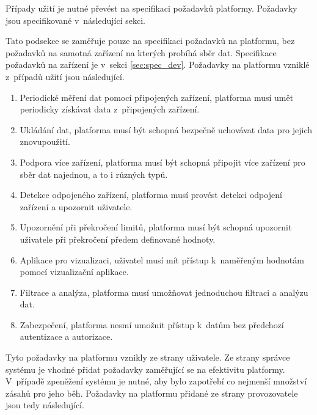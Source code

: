 Případy užití je nutné převést na specifikaci požadavků platformy. Požadavky jsou specifikované v~následující sekci.

 \label{sec:system_requirements}
Tato podsekce se zaměřuje pouze na specifikaci požadavků na platformu, bez požadavků na samotná zařízení na kterých probíhá sběr dat. Specifikace požadavků na zařízení je v~sekci \ref{sec:spec_dev}. Požadavky na platformu vzniklé z~případů užití jsou následující.
\begin{enumerate}
    \item Periodické měření dat pomocí připojených zařízení, platforma musí umět periodicky získávat data z~připojených zařízení. \label{spec:1}
    \item Ukládání dat, platforma musí být schopná bezpečně uchovávat data pro jejich znovupoužití. \label{spec:2}
    \item Podpora více zařízení, platforma musí být schopná připojit více zařízení pro sběr dat najednou, a to i různých typů. \label{spec:3}
    \item Detekce odpojeného zařízení, platforma musí provést detekci odpojení zařízení a upozornit uživatele. \label{spec:4}
    \item Upozornění při překročení limitů, platforma musí být schopná upozornit uživatele při překročení předem definované hodnoty. \label{spec:5}
    \item Aplikace pro vizualizaci, uživatel musí mít přístup k~naměřeným hodnotám pomocí vizualizační aplikace. \label{spec:6}
    \item Filtrace a analýza, platforma musí umožňovat jednoduchou filtraci a analýzu dat. \label{spec:7}
    \item Zabezpečení, platforma nesmí umožnit přístup k~datům bez předchozí autentizace a autorizace. \label{spec:8}
\end{enumerate}
Tyto požadavky na platformu vznikly ze strany uživatele. Ze strany správce systému je vhodné přidat požadavky zaměřující se na efektivitu platformy. V~případě zpeněžení systému je nutné, aby bylo zapotřebí co nejmenší množství zásahů pro jeho běh. Požadavky na platformu přidané ze strany provozovatele jsou tedy následující.
